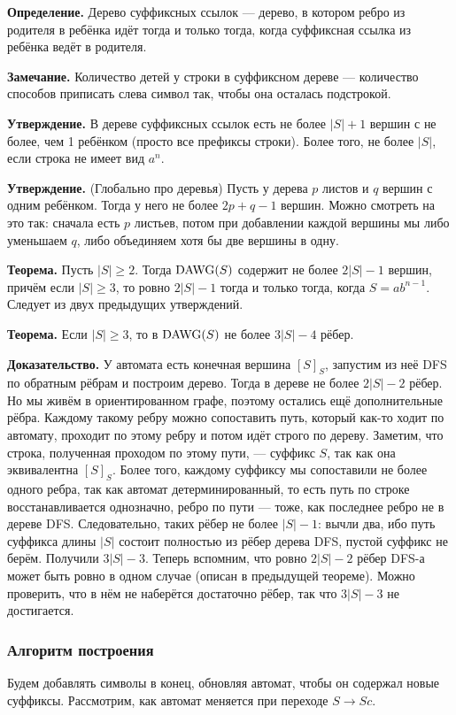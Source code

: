 \textbf{Определение.} Дерево суффиксных ссылок --- дерево, в котором ребро из родителя в ребёнка идёт тогда и только тогда, когда суффиксная ссылка из ребёнка ведёт в родителя.

\textbf{Замечание.} Количество детей у строки в суффиксном дереве --- количество способов приписать слева символ так, чтобы она осталась подстрокой.

\textbf{Утверждение.} В дереве суффиксных ссылок есть не более $|S| + 1$ вершин с не более, чем 1 ребёнком (просто все префиксы строки).
Более того, не более $|S|$, если строка не имеет вид $a^n$.

\textbf{Утверждение.} (Глобально про деревья) Пусть у дерева $p$ листов и $q$ вершин с одним ребёнком.
Тогда у него не более $2p + q - 1$ вершин.
Можно смотреть на это так: сначала есть $p$ листьев, потом при добавлении каждой вершины мы либо уменьшаем $q$, либо объединяем хотя бы две вершины в одну.

\textbf{Теорема.} Пусть $|S| \ge 2$. Тогда $\operatorname{DAWG}(S)$ содержит не более $2|S| - 1$ вершин, причём если $|S| \ge 3$, то ровно $2|S| - 1$ тогда и только тогда, когда $S = ab^{n-1}$.
Следует из двух предыдущих утверждений.

\textbf{Теорема.} Если $|S| \ge 3$, то в $\operatorname{DAWG}(S)$ не более $3|S| - 4$ рёбер.

\textbf{Доказательство.} У автомата есть конечная вершина $[S]_S$, запустим из неё DFS по обратным рёбрам и построим дерево.
Тогда в дереве не более $2|S| - 2$ рёбер.
Но мы живём в ориентированном графе, поэтому остались ещё дополнительные рёбра.
Каждому такому ребру можно сопоставить путь, который как-то ходит по автомату, проходит по этому ребру и потом идёт строго по дереву.
Заметим, что строка, полученная проходом по этому пути, --- суффикс $S$, так как она эквивалентна $[S]_S$.
Более того, каждому суффиксу мы сопоставили не более одного ребра, так как автомат детерминированный, то есть путь по строке восстанавливается однозначно, ребро по пути --- тоже, как последнее ребро не в дереве DFS.
Следовательно, таких рёбер не более $|S| - 1$: вычли два, ибо путь суффикса длины $|S|$ состоит полностью из рёбер дерева DFS, пустой суффикс не берём.
Получили $3|S| - 3$. Теперь вспомним, что ровно $2|S| - 2$ рёбер DFS-а может быть ровно в одном случае (описан в предыдущей теореме).
Можно проверить, что в нём не наберётся достаточно рёбер, так что $3|S| - 3$ не достигается.

\subsubsection{Алгоритм построения}
Будем добавлять символы в конец, обновляя автомат, чтобы он содержал новые суффиксы.
Рассмотрим, как автомат меняется при переходе $S \to Sc$.

